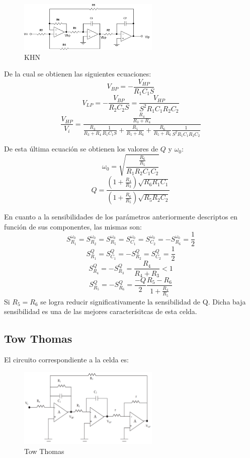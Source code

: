 \documentclass[../../tc_tp5_main.tex]{subfiles}
\begin{document}
\begin{figure}[H]	
	\centering
	\includegraphics[width=0.6\textwidth]{imagenes/KHN.png}
	\caption{KHN}
\end{figure}

De la cual se obtienen las siguientes ecuaciones:
$$ V_{BP}=- \frac{V_{HP}}{R_1 C_1  S} $$
$$ V_{LP}= - \frac{V_{BP}}{R_2 C_2 S}=\frac{V_{HP}}{S^2 R_1 C_1 R_2 C_2} $$
$$\frac{V_{HP}}{V_i}=  \frac{\frac{R_4}{R_3 + R_4}}{\frac{R_3}{R_3 + R_4} \frac{1}{R_1 C_1 S} + \frac{R_5}{R_5 + R_6} + \frac{R_6}{R_5 +R_6}\frac{1}{S^2 R_1 C_1 R_2 C_2} }$$

De esta \'ultima ecuación se obtienen los valores de $Q$ y $\omega_0$:
$$\omega_0=\sqrt{\frac{\frac{R_6}{R_5}}{R_1 R_2 C_1 C_2}} $$
$$ Q=\frac{\left( 1+\frac{R_4}{R_3} \right) \sqrt{R_6 R_1 C_1}}{\left( 1 + \frac{R_6}{R_5} \right) \sqrt{R_5 R_2 C_2} } $$

En cuanto a la sensibilidades de los par\'ametros anteriormente descriptos en funci\'on de sus componentes, las mismas son:
$$ S_{R_1}^{\omega_0}=S_{R_2}^{\omega_0}=S_{R_5}^{\omega_0}=S_{C_1}^{\omega_0}=S_{C_2}^{\omega_0}=-S_{R_6}^{\omega_0}=\frac{1}{2} $$
$$ S_{R_1}^{Q}=S_{C_1}^{Q}= -S_{R_2}^{Q}=S_{C_2}^{Q}=\frac{1}{2}$$
$$ S_{R_4}^{Q}=-S_{R_3}^{Q}=\frac{R_4}{R_4 +R_3} < 1$$
$$ S_{R_5}^{Q}=-S_{R_6}^{Q}=\frac{-Q}{2}\frac{R_5 - R_6}{1 + \frac{R_4}{R_5}} $$
Si $R_5=R_6$ se logra reducir significativamente la sensibilidad de Q. Dicha baja sensibilidad es una de las mejores caracter\'isitcas de esta celda.



\subsection{Tow Thomas}
El circuito correspondiente a la celda es:
\begin{figure}[H]	
	\centering
	\includegraphics[width=0.6\textwidth]{imagenes/tt.png}
	\caption{Tow Thomas}
\end{figure}
\end{document}
